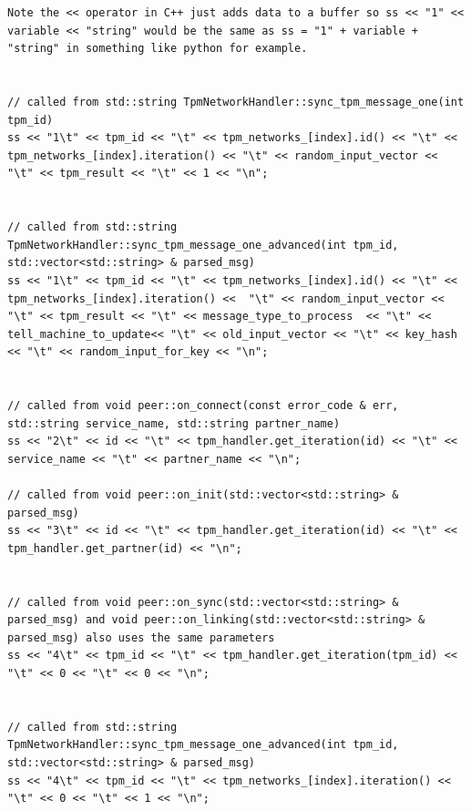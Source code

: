 \begin{lstlisting}
Note the << operator in C++ just adds data to a buffer so ss << "1" << variable << "string" would be the same as ss = "1" + variable + "string" in something like python for example.


// called from std::string TpmNetworkHandler::sync_tpm_message_one(int tpm_id)
ss << "1\t" << tpm_id << "\t" << tpm_networks_[index].id() << "\t" << tpm_networks_[index].iteration() << "\t" << random_input_vector << "\t" << tpm_result << "\t" << 1 << "\n";
  
  
// called from std::string TpmNetworkHandler::sync_tpm_message_one_advanced(int tpm_id, std::vector<std::string> & parsed_msg)
ss << "1\t" << tpm_id << "\t" << tpm_networks_[index].id() << "\t" << tpm_networks_[index].iteration() <<  "\t" << random_input_vector << "\t" << tpm_result << "\t" << message_type_to_process  << "\t" << tell_machine_to_update<< "\t" << old_input_vector << "\t" << key_hash << "\t" << random_input_for_key << "\n";


// called from void peer::on_connect(const error_code & err, std::string service_name, std::string partner_name)
ss << "2\t" << id << "\t" << tpm_handler.get_iteration(id) << "\t" << service_name << "\t" << partner_name << "\n";

// called from void peer::on_init(std::vector<std::string> & parsed_msg)
ss << "3\t" << id << "\t" << tpm_handler.get_iteration(id) << "\t" << tpm_handler.get_partner(id) << "\n";


// called from void peer::on_sync(std::vector<std::string> & parsed_msg) and void peer::on_linking(std::vector<std::string> & parsed_msg) also uses the same parameters
ss << "4\t" << tpm_id << "\t" << tpm_handler.get_iteration(tpm_id) << "\t" << 0 << "\t" << 0 << "\n";


// called from std::string TpmNetworkHandler::sync_tpm_message_one_advanced(int tpm_id, std::vector<std::string> & parsed_msg)
ss << "4\t" << tpm_id << "\t" << tpm_networks_[index].iteration() << "\t" << 0 << "\t" << 1 << "\n";
\end{lstlisting}












 